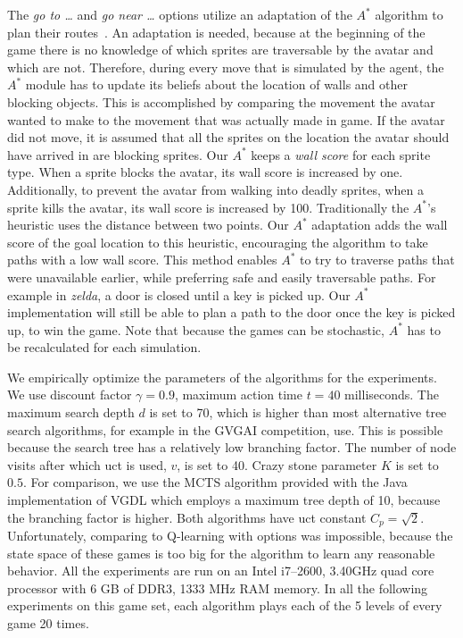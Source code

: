 The \emph{go to \ldots} and \emph{go near \ldots} options utilize an adaptation
of the $A^*$ algorithm to plan their routes~\cite{hart1968formal}. An
adaptation is needed, because at the beginning of the game there is no knowledge
of which sprites are traversable by the avatar and which are not. Therefore,
during every move that is simulated by the agent, the $A^*$ module has to
update its beliefs about the location of walls and other blocking objects. This
is accomplished by comparing the movement the avatar wanted to make to the
movement that was actually made in game. If the avatar did not move, it is
assumed that all the sprites on the location the avatar should have arrived in
are blocking sprites. Our $A^*$ keeps a \emph{wall score} for each sprite type.
When a sprite blocks the avatar, its wall score is increased by one.
Additionally, to prevent the avatar from walking into deadly sprites, when a
sprite kills the avatar, its wall score is increased by 100.  Traditionally the
$A^*$'s heuristic uses the distance between two points. Our $A^*$ adaptation
adds the wall score of the goal location to this heuristic, encouraging the
algorithm to take paths with a low wall score. This method enables $A^*$ to
try to traverse paths that were unavailable earlier, while preferring safe and
easily traversable paths. For example in \textit{zelda}, a door is closed until
a key is picked up. Our $A^*$ implementation will still be able to plan a path
to the door once the key is picked up, to win the game. Note that because the
games can be stochastic, $A^*$ has to be recalculated for each simulation.

We empirically optimize the parameters of the algorithms for the experiments.
We use discount factor $\gamma = 0.9$, maximum action time $t = 40$
milliseconds. The maximum search depth $d$ is set to 70, which is higher than
most alternative tree search algorithms, for example in the GVGAI competition,
use. This is possible because the search tree has a relatively low branching
factor. The number of node visits after which \textsf{uct} is used, $v$, is set
to 40. Crazy stone parameter $K$ is set to $0.5$.  For comparison, we use the
MCTS algorithm provided with the Java implementation of VGDL which employs a
maximum tree depth of 10, because the branching factor is higher. Both
algorithms have \textsf{uct} constant $C_p = \sqrt{2}$. Unfortunately, comparing
to Q-learning with options was impossible, because the state space of these
games is too big for the algorithm to learn any reasonable behavior. All the
experiments are run on an Intel i7--2600, 3.40GHz quad core processor with 6 GB
of DDR3, 1333 MHz RAM memory. In all the following experiments on this game set,
each algorithm plays each of the 5 levels of every game 20 times.

